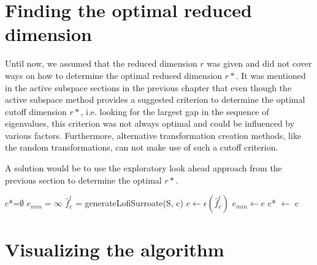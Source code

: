 \documentclass[
  a4paper,  %
  twoside,  %
  bibliography=totoc,
  headsepline,
  cleardoublepage=empty,
  parskip=half,
  draft=false
]{scrbook}
\begin{document}

\section{Finding the optimal reduced dimension}

Until now, we assumed that the reduced dimension $r$ was given and did not cover ways on how to determine the optimal reduced dimension $r*$.
It was mentioned in the active subspace sections in the previous chapter that even though the active subspace method provides a suggested criterion to determine the optimal cutoff dimension $r*$, i.e. looking for the largest gap in the sequence of eigenvalues, this criterion was not always optimal and could be influenced by various factors.
Furthermore, alternative transformation creation methods, like the random transformations, can not make use of such a cutoff criterion.

A solution would be to use the exploratory look ahead approach from the previous section to determine the optimal $r*$.

\begin{algorithm}[H]
\normalsize
\begin{algorithmic}
    \State c*=$\emptyset$
    \State $e_{min}=\infty$
      \State $\hat{f}_c^l$ = generateLofiSurroate(S, c)
    	\State $e \gets \epsilon(\hat{f}_c^l)$
    	  \State $e_{min}\gets e$
    	\State c* $\gets$ c
    	\EndIf
    \EndFor
    \State {}
\EndFunction
\end{algorithmic}
\end{algorithm}

\newpage
\section{Visualizing the algorithm}
\end{document}
